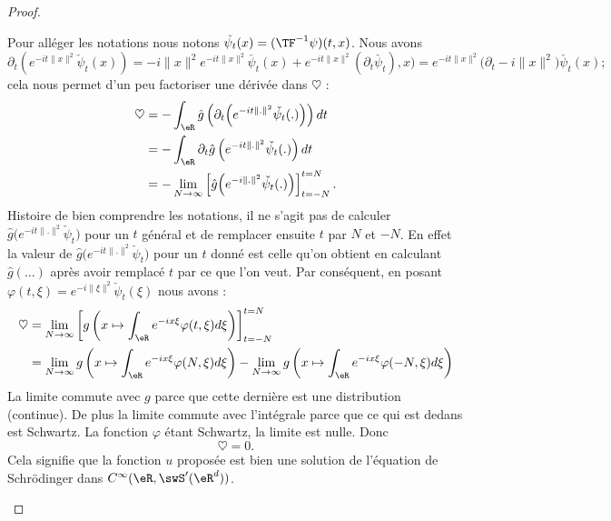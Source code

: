 \begin{proof}
\begin{subproof}
        Pour alléger les notations nous notons \( \check{\psi_t}(x)=(\TF^{-1}\psi)(t,x)\). Nous avons
        \begin{equation}
            \partial_t\left(  e^{-it\| x \|^2}\check\psi_t(x) \right)=-i\| x \|^2 e^{-it\| x \|^2}\check{\psi_t}(x)+ e^{-it\| x \|^2}(\partial_t\check{\psi_t}),x)= e^{-it\| x \|^2}\big( \partial_t-i\| x \|^2 \big)\check{\psi_t}(x);
        \end{equation}
        cela nous permet d'un peu factoriser une dérivée dans \( \heartsuit\) :
        \begin{subequations}
            \begin{align}
                \heartsuit&=-\int_{\eR}\hat g\left( \partial_t\Big(  e^{-it\| . \|^2}\check{\psi_t}(.) \Big) \right)dt\\
                &=-\int_{\eR}\partial_t\hat g\left(  e^{-it\| . \|^2}\check{\psi_t}(.) \right)dt\\
                &=-\lim_{N\to \infty} \left[ \hat g\Big(  e^{-i\| . \|^2}\check{\psi_t}(.) \Big) \right]_{t=-N}^{t=N}.
            \end{align}
        \end{subequations}
        Histoire de bien comprendre les notations, il ne s'agit pas de calculer \( \hat g\big(  e^{-it\| . \|^2}\check\psi_t \big)\) pour un \( t\) général et de remplacer ensuite \( t\) par \( N\) et \( -N\). En effet la valeur de \( \hat g\big(  e^{-it\| . \|^2}\check\psi_t \big)\) pour un \( t\) donné est celle qu'on obtient en calculant \( \hat g(\ldots)\) après avoir remplacé \( t\) par ce que l'on veut. Par conséquent, en posant \( \varphi(t,\xi)= e^{-i\| \xi \|^2}\check\psi_t(\xi)\) nous avons :
        \begin{subequations}
            \begin{align}
                \heartsuit&=\lim_{N\to \infty} \left[ g\left( x\mapsto\int_{\eR} e^{-ix\xi}\varphi(t,\xi )d\xi \right) \right]_{t=-N}^{t=N}\\
                &=\lim_{N\to \infty} g\left( x\mapsto\int_{\eR} e^{-ix\xi}\varphi(N,\xi )d\xi \right)-\lim_{N\to \infty} g\left( x\mapsto\int_{\eR} e^{-ix\xi}\varphi(-N,\xi )d\xi \right)
            \end{align}
        \end{subequations}
        La limite commute avec \( g\) parce que cette dernière est une distribution (continue). De plus la limite commute avec l'intégrale parce que ce qui est dedans est Schwartz. La fonction \( \varphi\) étant Schwartz, la limite est nulle. Donc
        \begin{equation}
            \heartsuit=0.
        \end{equation}
        Cela signifie que la fonction \( u\) proposée est bien une solution de l'équation de Schrödinger dans \(  C^{\infty}(\eR,\swS'(\eR^d))\).


\end{subproof}
\end{proof}
